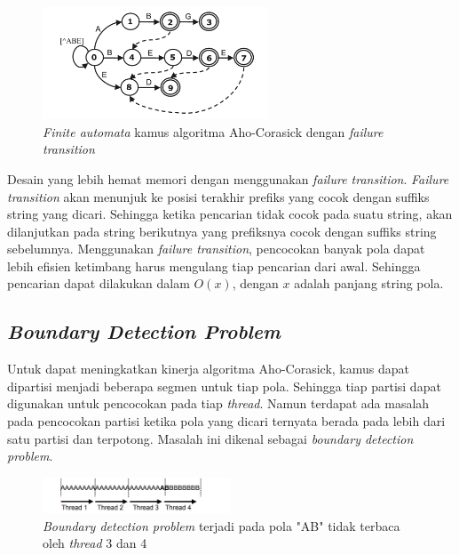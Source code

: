     \begin{figure}[htb]
      \centering
      \includegraphics[width=0.6\textwidth]{resources/aho-c.png}
      \caption[\emph{Finite automata} kamus algoritma Aho-Corasick dengan \emph{failure transition}]{\emph{Finite automata} kamus algoritma Aho-Corasick dengan \emph{failure transition} \citep{lin2013}}
    \end{figure}

    Desain yang lebih hemat memori dengan menggunakan \emph{failure transition}. \emph{Failure transition} akan menunjuk ke posisi terakhir prefiks yang cocok dengan suffiks string yang dicari. Sehingga ketika pencarian tidak cocok pada suatu string, akan dilanjutkan pada string berikutnya yang prefiksnya cocok dengan suffiks string sebelumnya. Menggunakan \emph{failure transition}, pencocokan banyak pola dapat lebih efisien ketimbang harus mengulang tiap pencarian dari awal. Sehingga pencarian dapat dilakukan dalam $O(x)$, dengan $x$ adalah panjang string pola.

  \subsection {\emph{Boundary Detection Problem}}

  Untuk dapat meningkatkan kinerja algoritma Aho-Corasick, kamus dapat dipartisi menjadi beberapa segmen untuk tiap pola. Sehingga tiap partisi dapat digunakan untuk pencocokan pada tiap \emph{thread}. Namun terdapat ada masalah pada pencocokan partisi ketika pola yang dicari ternyata berada pada lebih dari satu partisi dan terpotong. Masalah ini dikenal sebagai \emph{boundary detection problem}. 

    \begin{figure}[htb]
      \centering
      \includegraphics[width=0.5\textwidth]{resources/boundary.png}
      \caption[\emph{Boundary detection problem} terjadi pada pola "AB" tidak terbaca oleh \emph{thread} 3 dan 4]{\emph{Boundary detection problem} terjadi pada pola "AB" tidak terbaca oleh \emph{thread} 3 dan 4 \citep{lin2013}}
    \end{figure}

